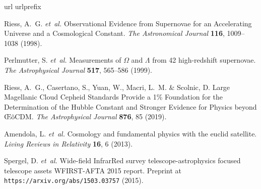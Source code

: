 
\begin{thebibliography}{10}
\expandafter\ifx\csname url\endcsname\relax
  \def\url#1{\texttt{#1}}\fi
\expandafter\ifx\csname urlprefix\endcsname\relax\def\urlprefix{URL }\fi
\providecommand{\bibinfo}[2]{#2}
\providecommand{\eprint}[2][]{\url{#2}}

\bibinfo{author}{Riess, A.~G.} \emph{et~al.}
\newblock \bibinfo{title}{Observational {Evidence} from {Supernovae} for an
  {Accelerating} {Universe} and a {Cosmological} {Constant}}.
\newblock \emph{\bibinfo{journal}{The Astronomical Journal}}
  \textbf{\bibinfo{volume}{116}}, \bibinfo{pages}{1009--1038}
  (\bibinfo{year}{1998}).

\bibinfo{author}{Perlmutter, S.} \emph{et~al.}
\newblock \bibinfo{title}{Measurements of $\Omega$ and $\Lambda$ from 42 high-redshift
  supernovae}.
\newblock \emph{\bibinfo{journal}{The Astrophysical Journal}}
  \textbf{\bibinfo{volume}{517}}, \bibinfo{pages}{565--586}
  (\bibinfo{year}{1999}).

\bibinfo{author}{Riess, A.~G.}, \bibinfo{author}{Casertano, S.},
  \bibinfo{author}{Yuan, W.}, \bibinfo{author}{Macri, L.~M.} \&
  \bibinfo{author}{Scolnic, D.}
\newblock \bibinfo{title}{Large {Magellanic} {Cloud} {Cepheid} {Standards}
  {Provide} a 1\% {Foundation} for the {Determination} of the {Hubble}
  {Constant} and {Stronger} {Evidence} for {Physics} beyond Œõ{CDM}}.
\newblock \emph{\bibinfo{journal}{The Astrophysical Journal}}
  \textbf{\bibinfo{volume}{876}}, \bibinfo{pages}{85} (\bibinfo{year}{2019}).
\newblock

\bibinfo{author}{Amendola, L.} \emph{et~al.}
\newblock \bibinfo{title}{Cosmology and fundamental physics with the euclid
  satellite}.
\newblock \emph{\bibinfo{journal}{Living Reviews in Relativity}}
  \textbf{\bibinfo{volume}{16}}, \bibinfo{pages}{6} (\bibinfo{year}{2013}).

\bibinfo{author}{Spergel, D.} \emph{et~al.}
\newblock \bibinfo{title}{Wide-field {InfrarRed} survey telescope-astrophysics
  focused telescope assets {WFIRST}-{AFTA} 2015 report}.
\newblock Preprint at \url{https://arxiv.org/abs/1503.03757}
(\bibinfo{year}{2015}).


\end{thebibliography}

